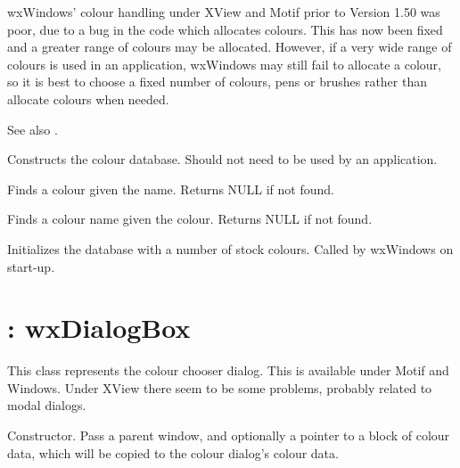 wxWindows' colour handling under XView and Motif prior to Version 1.50
was poor, due to a bug in the code which allocates colours. This has
now been fixed and a greater range of colours may be allocated.
However, if a very wide range of colours is used in an application,
wxWindows may still fail to allocate a colour, so it is best to choose
a fixed number of colours, pens or brushes rather than allocate
colours when needed.

See also .



Constructs the colour database.  Should not need to be used by an 
application.



Finds a colour given the name.  Returns NULL if not found.



Finds a colour name given the colour. Returns NULL if not found.



Initializes the database with a number of stock colours.  Called by wxWindows
on start-up.

\section{: wxDialogBox}\label{wxcolourdialog}


This class represents the colour chooser dialog. This is available under
Motif and Windows. Under XView there seem to be some problems, probably
related to modal dialogs.



Constructor. Pass a parent window, and optionally a pointer to a block of colour
data, which will be copied to the colour dialog's colour data.

